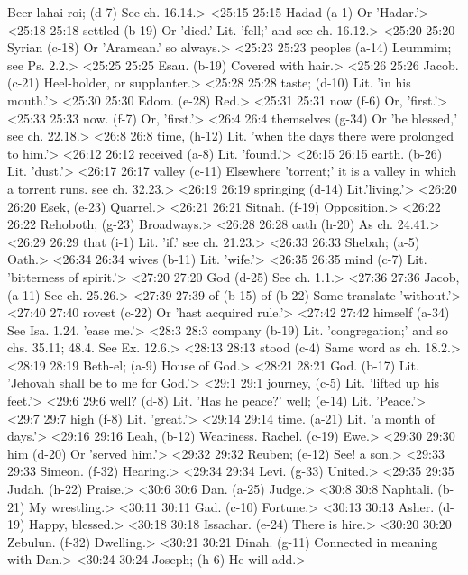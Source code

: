   Beer-lahai-roi; (d-7)  See ch. 16.14.>
<25:15 25:15  Hadad (a-1)  Or 'Hadar.'>
<25:18 25:18  settled (b-19)  Or 'died.' Lit. 'fell;' and see ch. 16.12.>
<25:20 25:20  Syrian (c-18)  Or 'Aramean.' so always.>
<25:23 25:23  peoples (a-14)  Leummim; see Ps. 2.2.>
<25:25 25:25  Esau. (b-19)  Covered with hair.>
<25:26 25:26  Jacob. (c-21)  Heel-holder, or supplanter.>
<25:28 25:28  taste; (d-10)  Lit. 'in his mouth.'>
<25:30 25:30  Edom. (e-28)  Red.>
<25:31 25:31  now (f-6) Or, 'first.'>
<25:33 25:33  now. (f-7)  Or, 'first.'>
<26:4 26:4  themselves (g-34)  Or 'be blessed,' see ch. 22.18.>
<26:8 26:8  time, (h-12)  Lit. 'when the days there were prolonged to him.'>
<26:12 26:12  received (a-8)  Lit. 'found.'>
<26:15 26:15  earth. (b-26)  Lit. 'dust.'>
<26:17 26:17  valley (c-11)  Elsewhere 'torrent;' it is a valley in which a torrent runs.  see ch. 32.23.>
<26:19 26:19  springing (d-14)  Lit.'living.'>
<26:20 26:20  Esek, (e-23)  Quarrel.>
<26:21 26:21  Sitnah. (f-19)  Opposition.>
<26:22 26:22  Rehoboth, (g-23)  Broadways.>
<26:28 26:28  oath (h-20)  As ch. 24.41.>
<26:29 26:29  that (i-1)  Lit. 'if.' see ch. 21.23.>
<26:33 26:33  Shebah; (a-5)  Oath.>
<26:34 26:34  wives (b-11)  Lit. 'wife.'>
<26:35 26:35  mind (c-7)  Lit. 'bitterness of spirit.'>
<27:20 27:20  God (d-25)  See ch. 1.1.>
<27:36 27:36  Jacob, (a-11)  See ch. 25.26.>
<27:39 27:39  of (b-15)  of (b-22)
  Some translate 'without.'>
<27:40 27:40  rovest (c-22)  Or 'hast acquired rule.'>
<27:42 27:42  himself (a-34)  See Isa. 1.24. 'ease me.'>
<28:3 28:3  company (b-19)  Lit. 'congregation;' and so chs. 35.11; 48.4. See Ex. 12.6.>
<28:13 28:13  stood (c-4)  Same word as ch. 18.2.>
<28:19 28:19  Beth-el; (a-9)  House of God.>
<28:21 28:21  God. (b-17)  Lit. 'Jehovah shall be to me for God.'>
<29:1 29:1  journey, (c-5)  Lit. 'lifted up his feet.'>
<29:6 29:6  well? (d-8)  Lit. 'Has he peace?'
  well; (e-14)  Lit. 'Peace.'>
<29:7 29:7  high (f-8)  Lit. 'great.'>
<29:14 29:14  time. (a-21)  Lit. 'a month of days.'>
<29:16 29:16  Leah, (b-12)  Weariness.
  Rachel. (c-19)  Ewe.>
<29:30 29:30  him (d-20)  Or 'served him.'>
<29:32 29:32  Reuben; (e-12)  See! a son.>
<29:33 29:33  Simeon. (f-32)  Hearing.>
<29:34 29:34  Levi. (g-33)  United.>
<29:35 29:35  Judah. (h-22)  Praise.>
<30:6 30:6  Dan. (a-25)  Judge.>
<30:8 30:8  Naphtali. (b-21)  My wrestling.>
<30:11 30:11  Gad. (c-10)  Fortune.>
<30:13 30:13  Asher. (d-19)  Happy, blessed.>
<30:18 30:18  Issachar. (e-24)  There is hire.>
<30:20 30:20  Zebulun. (f-32)  Dwelling.>
<30:21 30:21  Dinah. (g-11)  Connected in meaning with Dan.>
<30:24 30:24  Joseph; (h-6)  He will add.>
